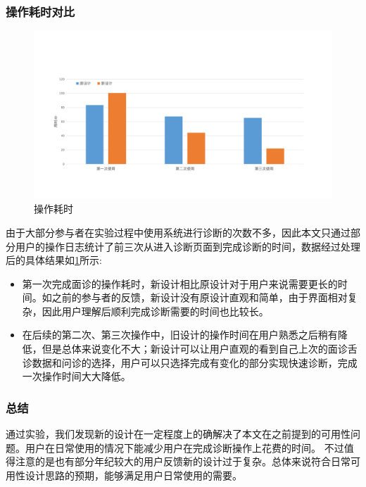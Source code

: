 \subsubsection{操作耗时对比}

\begin{figure}[ht]
    \centering
    \includegraphics[width=13cm]{images/time.pdf}
    \caption{操作耗时}
    \label{fig:ui-time}
\end{figure}

由于大部分参与者在实验过程中使用系统进行诊断的次数不多，因此本文只通过部分用户的操作日志统计了前三次从进入诊断页面到完成诊断的时间，数据经过处理后的具体结果如\ref{fig:ui-time}所示:

\begin{itemize}

    \item 第一次完成面诊的操作耗时，新设计相比原设计对于用户来说需要更长的时间。如之前的参与者的反馈，新设计没有原设计直观和简单，由于界面相对复杂，因此用户理解后顺利完成诊断需要的时间也比较长。

    \item 在后续的第二次、第三次操作中，旧设计的操作时间在用户熟悉之后稍有降低，但是总体来说变化不大；新设计可以让用户直观的看到自己上次的面诊舌诊数据和问诊的选择，用户可以只选择完成有变化的部分实现快速诊断，完成一次操作时间大大降低。

\end{itemize}

\subsubsection{总结}
通过实验，我们发现新的设计在一定程度上的确解决了本文在之前提到的可用性问题。用户在日常使用的情况下能减少用户在完成诊断操作上花费的时间。
不过值得注意的是也有部分年纪较大的用户反馈新的设计过于复杂。总体来说符合日常可用性设计思路的预期，能够满足用户日常使用的需要。


